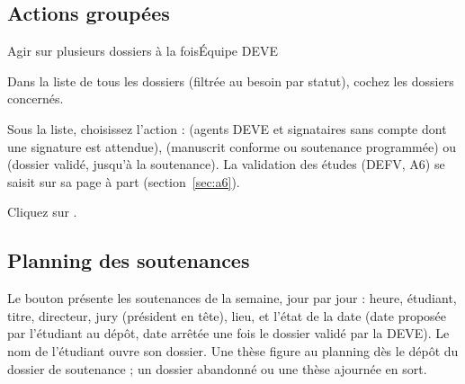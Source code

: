 \documentclass[11pt,a4paper]{article}
\begin{document}


\subsection{Actions groupées}\label{sec:lot}

\begin{procedure}{Agir sur plusieurs dossiers à la fois}{Équipe DEVE}
\begin{etapes}
  \item Dans la liste de tous les dossiers (filtrée au besoin par statut),
        cochez les dossiers concernés.
  \item Sous la liste, choisissez l'action :  (agents DEVE et signataires sans compte dont une
        signature est attendue), 
        (manuscrit conforme ou soutenance programmée) ou  (dossier validé, jusqu'à la
        soutenance). La validation des études (DEFV, A6) se saisit sur sa page à
        part (section~\ref{sec:a6}).
  \item Cliquez sur .
\end{etapes}
\end{procedure}


\subsection{Planning des soutenances}\label{sec:planning}

Le bouton  présente les soutenances de la
semaine, jour par jour : heure, étudiant, titre, directeur, jury (président en
tête), lieu, et l'état de la date (\og date proposée\fg{} par l'étudiant au
dépôt, \og date arrêtée\fg{} une fois le dossier validé par la DEVE). Le nom
de l'étudiant ouvre son dossier. Une thèse figure au planning dès le dépôt du
dossier de soutenance ; un dossier abandonné ou une thèse ajournée en sort.
\end{document}

